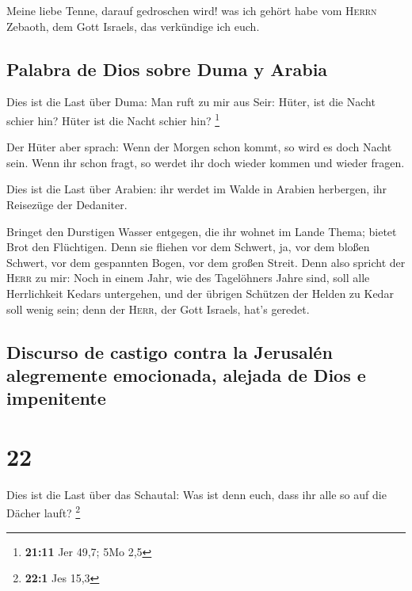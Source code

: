  Meine liebe Tenne, darauf gedroschen wird! was ich
gehört habe vom \textsc{Herrn} Zebaoth, dem Gott Israels, das verkündige
ich euch.

\hypertarget{palabra-de-dios-sobre-duma-y-arabia}{%
\subsection{Palabra de Dios sobre Duma y
Arabia}\label{palabra-de-dios-sobre-duma-y-arabia}}

 Dies ist die Last über Duma: Man ruft zu mir aus Seir:
Hüter, ist die Nacht schier hin? Hüter ist die Nacht schier hin?
\footnote{\textbf{21:11} Jer 49,7; 5Mo 2,5}

 Der Hüter aber sprach: Wenn der Morgen schon kommt, so
wird es doch Nacht sein. Wenn ihr schon fragt, so werdet ihr doch wieder
kommen und wieder fragen.

 Dies ist die Last über Arabien: ihr werdet im Walde in
Arabien herbergen, ihr Reisezüge der Dedaniter.

 Bringet den Durstigen Wasser entgegen, die ihr wohnet im
Lande Thema; bietet Brot den Flüchtigen.  Denn sie
fliehen vor dem Schwert, ja, vor dem bloßen Schwert, vor dem gespannten
Bogen, vor dem großen Streit.  Denn also spricht der
\textsc{Herr} zu mir: Noch in einem Jahr, wie des Tagelöhners Jahre
sind, soll alle Herrlichkeit Kedars untergehen,  und der
übrigen Schützen der Helden zu Kedar soll wenig sein; denn der
\textsc{Herr}, der Gott Israels, hat's geredet.

\hypertarget{discurso-de-castigo-contra-la-jerusaluxe9n-alegremente-emocionada-alejada-de-dios-e-impenitente}{%
\subsection{Discurso de castigo contra la Jerusalén alegremente
emocionada, alejada de Dios e
impenitente}\label{discurso-de-castigo-contra-la-jerusaluxe9n-alegremente-emocionada-alejada-de-dios-e-impenitente}}

\hypertarget{section-21}{%
\section{22}\label{section-21}}

 Dies ist die Last über das Schautal: Was ist denn euch,
dass ihr alle so auf die Dächer lauft? \footnote{\textbf{22:1} Jes 15,3}

